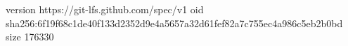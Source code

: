 version https://git-lfs.github.com/spec/v1
oid sha256:6f19f68c1de40f133d2352d9e4a5657a32d61fef82a7c755ec4a986c5eb2b0bd
size 176330
